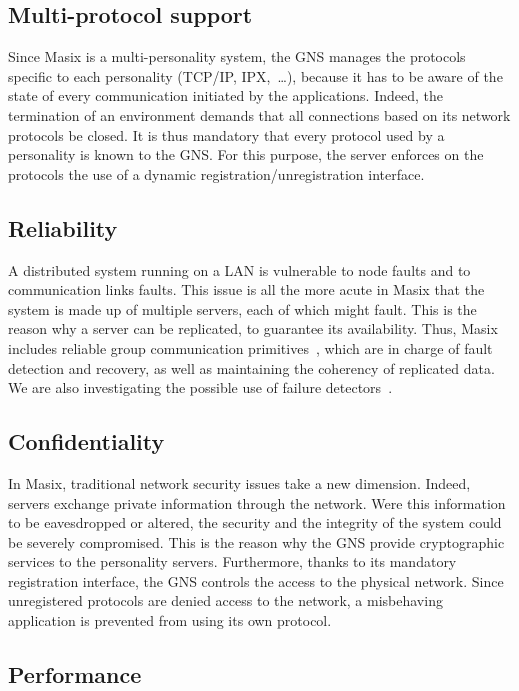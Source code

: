 \subsection{Multi-protocol support}

Since Masix is a multi-personality system, the GNS
manages the protocols specific to each personality (TCP/IP, IPX,~\dots),
because it has to be aware of the state of every communication initiated by the
applications. Indeed, the termination of an environment demands that 
all connections
based on its network protocols be closed. It is thus mandatory that every
protocol used by a personality is known to the GNS. 
For this purpose, the server enforces on the protocols the use of a 
dynamic registration/unregistration interface.

\subsection{Reliability}

A distributed system running on a LAN is vulnerable to node faults and to 
communication links faults. This issue is all the more acute in Masix
that the system is made up of multiple servers, each of which might fault.
This is the reason  why a server can be replicated, 
to guarantee its availability.  Thus, Masix includes 
reliable group communication
 primitives~\cite{Schiper93,Hadzi94}, which are in charge of fault detection 
and recovery, as well as maintaining the coherency of replicated data. 
We are also investigating the possible use of failure detectors~\cite{Chandra91}.

\subsection{Confidentiality}

In Masix, traditional network security issues take a new dimension.
Indeed, servers exchange private information through the network. Were this
information to be eavesdropped or altered, the security and the integrity
of the system could be severely compromised. This is the reason why the
GNS provide cryptographic services to the personality servers. Furthermore, 
thanks to its mandatory registration interface, the GNS
controls the access to the physical network. Since unregistered protocols
are denied access to the network, a misbehaving application is prevented from using its own protocol.

\subsection{Performance}

